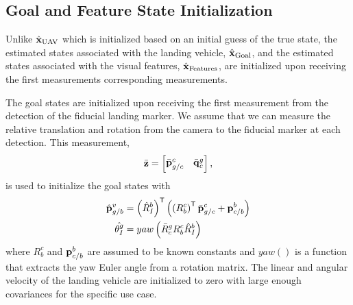 
\subsection{Goal and Feature State Initialization}
Unlike $\hat{\boldsymbol{\mathrm{x}}}_{\text{UAV}}$ which is initialized based on an initial
guess of the true state, the estimated states associated with the landing
vehicle, $\hat{\boldsymbol{\mathrm{x}}}_{\text{Goal}}$, and the estimated states associated
with the visual features, $\hat{\boldsymbol{\mathrm{x}}}_{\text{Features}}$, are initialized
upon receiving the first measurements corresponding measurements.

The goal states are initialized upon receiving the first measurement from
the detection of the fiducial landing marker. We assume that we can measure the
relative translation and rotation from the camera to the fiducial marker
at each detection. This measurement,
\begin{equation}
  \bar{\boldsymbol{\mathrm{z}}} =
  \begin{bmatrix}
    \bar{\boldsymbol{\mathrm{p}}}_{g/c}^c & \bar{\boldsymbol{\mathrm{q}}}_c^g
  \end{bmatrix},
  \label{eq:fiducial_meas}
\end{equation}
is used to initialize the goal states with
\begin{align}
  \hat{\boldsymbol{\mathrm{p}}}_{g/b}^v &= \left( \hat{R}_I^b \right)^{\mathsf{T}} \left( \left ( R_b^c
  \right)^{\mathsf{T}} \bar{\boldsymbol{\mathrm{p}}}_{g/c}^c + \boldsymbol{\mathrm{p}}_{c/b}^b
\right)   \\
      \hat{\theta_I^g} &= yaw \left( \bar{R}_c^g R_b^c \hat{R}_I^b \right)
\end{align}
where $R_b^c$ and $\boldsymbol{\mathrm{p}}_{c/b}^b$ are assumed to be known constants and
$yaw()$ is a function that extracts the yaw Euler angle from a rotation matrix.
The linear and angular velocity of the landing vehicle are initialized to
zero with large enough covariances for the specific use case.

